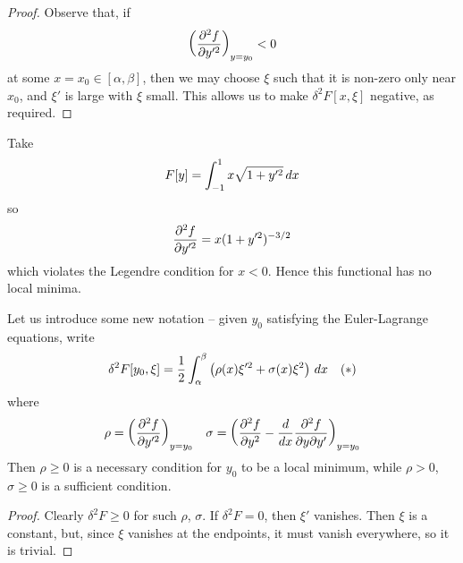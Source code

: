 \documentclass{../../template/note}
\begin{document}
    \begin{proof}
        Observe that, if
        \begin{align*}
            \left(\pd{^2f}{y'^2}\right)_{y=y_0} < 0
        \end{align*}
        at some $x = x_0 \in [\alpha, \beta]$, then we may choose $\xi$ such that it is non-zero only near $x_0$, and $\xi'$ is large with $\xi$ small. This allows us to make $\delta^2 F[x, \xi]$ negative, as required.        
    \end{proof}
    
    \begin{example*}
        Take
        \begin{align*}
            F[y] = \int_{-1}^1 x\sqrt{1+y'^2} \,d{x}
        \end{align*}
        so
        \begin{align*}
            \pd{^2f}{y'^2} = x(1+y'^2)^{-3/2}
        \end{align*}
        which violates the Legendre condition for $x < 0$. Hence this functional has no local minima.       
    \end{example*}
    
    Let us introduce some new notation -- given $y_0$ satisfying the Euler-Lagrange equations, write
    \begin{align*}
        \delta^2 F[y_0, \xi] = \frac 1 2 \int_\alpha^\beta \left(\rho(x) \xi'^2 + \sigma(x) \xi^2\right) \,d{x} && (*)
    \end{align*}
    where
    \begin{align*}
        \rho = \left(\pd{^2f}{y'^2}\right)_{y=y_0} && \sigma = \left(\pd{^2f}{y^2} - \frac{d}{dx} \pd{^2f}{y\pr y'}\right)_{y=y_0}
    \end{align*}
    Then $\rho \geq 0$ is a necessary condition for $y_0$ to be a local minimum, while $\rho > 0$, $\sigma \geq 0$ is a sufficient condition.

    \begin{proof}
        Clearly $\delta^2 F \geq 0$ for such $\rho$, $\sigma$. If $\delta^2 F = 0$, then $\xi'$ vanishes. Then $\xi$ is a constant, but, since $\xi$ vanishes at the endpoints, it must vanish everywhere, so it is trivial.
    \end{proof}
    
\end{document}
